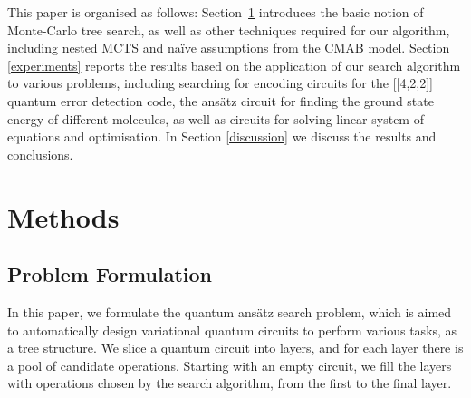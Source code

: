 \documentclass{ieeeaccess}
\begin{document}
This paper is organised as follows: Section~\ref{methods} introduces the basic notion of Monte-Carlo tree search, as well as other techniques required for our algorithm, including nested MCTS and na\"ive assumptions from the CMAB model. Section \ref{experiments}  reports the results based on the application of our search algorithm to various problems, including searching for encoding circuits for the [[4,2,2]] quantum error detection code, the ans\"atz circuit for finding the ground state energy of different molecules, as well as circuits for solving linear system of equations and optimisation. In Section \ref{discussion} we discuss the results and conclusions.

\section{Methods}\label{methods}
\subsection{Problem Formulation}
In this paper, we formulate the quantum ans\"atz search problem, which is aimed to automatically design variational quantum circuits to perform various tasks, as a tree structure. We slice a quantum circuit into layers, and for each layer there is a pool of candidate operations. Starting with an empty circuit, we fill the layers with operations chosen by the search algorithm, from the first to the final layer. 
\end{document}
